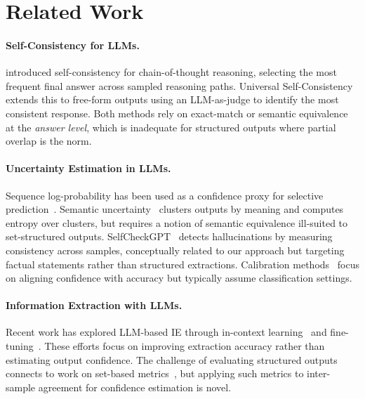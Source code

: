 \documentclass[11pt,a4paper]{article}
\begin{document}
\section{Related Work}
\label{sec:related}

\paragraph{Self-Consistency for LLMs.}
\cite{wang2023selfconsistency} introduced self-consistency for chain-of-thought reasoning, selecting the most frequent final answer across sampled reasoning paths. Universal Self-Consistency~\cite{chen2024universal} extends this to free-form outputs using an LLM-as-judge to identify the most consistent response. Both methods rely on exact-match or semantic equivalence at the \emph{answer level}, which is inadequate for structured outputs where partial overlap is the norm.

\paragraph{Uncertainty Estimation in LLMs.}
Sequence log-probability has been used as a confidence proxy for selective prediction~\cite{kadavath2022language}. Semantic uncertainty~\cite{kuhn2023semantic} clusters outputs by meaning and computes entropy over clusters, but requires a notion of semantic equivalence ill-suited to set-structured outputs. SelfCheckGPT~\cite{manakul2023selfcheckgpt} detects hallucinations by measuring consistency across samples, conceptually related to our approach but targeting factual statements rather than structured extractions. Calibration methods~\cite{desai2020calibration,jiang2021can} focus on aligning confidence with accuracy but typically assume classification settings.

\paragraph{Information Extraction with LLMs.}
Recent work has explored LLM-based IE through in-context learning~\cite{li2023evaluating,xu2024large} and fine-tuning~\cite{wang2023instructuie}. These efforts focus on improving extraction accuracy rather than estimating output confidence. The challenge of evaluating structured outputs connects to work on set-based metrics~\cite{derczynski2016broad}, but applying such metrics to inter-sample agreement for confidence estimation is novel.
\end{document}
